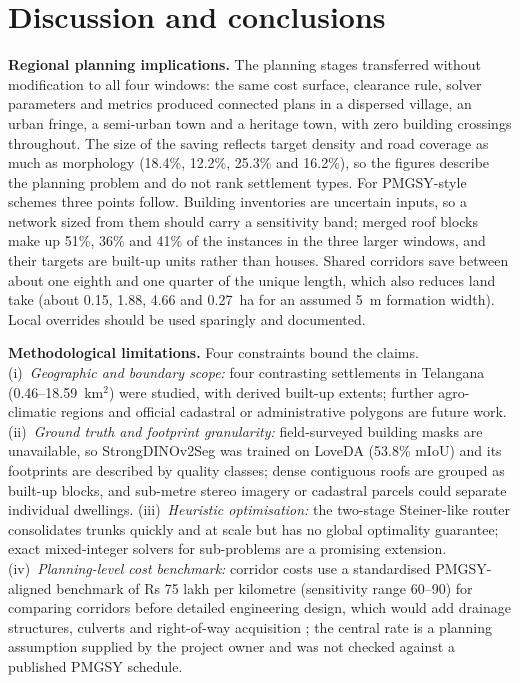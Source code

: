 \documentclass[10pt,a4paper,twocolumn]{article}
\newcommand{\dinoseg}{StrongDINOv2Seg}
\begin{document}
\section{Discussion and conclusions}\label{sec:disc}
\textbf{Regional planning implications.} The planning stages transferred without modification to all four windows: the same cost surface, clearance rule, solver parameters and metrics produced connected plans in a dispersed village, an urban fringe, a semi-urban town and a heritage town, with zero building crossings throughout. The size of the saving reflects target density and road coverage as much as morphology (18.4\%, 12.2\%, 25.3\% and 16.2\%), so the figures describe the planning problem and do not rank settlement types. For PMGSY-style schemes \cite{pmgsy,irc2002sp20} three points follow. Building inventories are uncertain inputs, so a network sized from them should carry a sensitivity band; merged roof blocks make up 51\%, 36\% and 41\% of the instances in the three larger windows, and their targets are built-up units rather than houses. Shared corridors save between about one eighth and one quarter of the unique length, which also reduces land take (about 0.15, 1.88, 4.66 and 0.27~ha for an assumed 5~m formation width). Local overrides should be used sparingly and documented.

\textbf{Methodological limitations.} Four constraints bound the claims. (i)~\emph{Geographic and boundary scope:} four contrasting settlements in Telangana (0.46--18.59~km$^2$) were studied, with derived built-up extents; further agro-climatic regions and official cadastral or administrative polygons are future work. (ii)~\emph{Ground truth and footprint granularity:} field-surveyed building masks are unavailable, so \dinoseg{} was trained on LoveDA (53.8\% mIoU) and its footprints are described by quality classes; dense contiguous roofs are grouped as built-up blocks, and sub-metre stereo imagery or cadastral parcels could separate individual dwellings. (iii)~\emph{Heuristic optimisation:} the two-stage Steiner-like router consolidates trunks quickly and at scale but has no global optimality guarantee; exact mixed-integer solvers for sub-problems are a promising extension. (iv)~\emph{Planning-level cost benchmark:} corridor costs use a standardised PMGSY-aligned benchmark of Rs 75 lakh per kilometre (sensitivity range 60--90) for comparing corridors before detailed engineering design, which would add drainage structures, culverts and right-of-way acquisition \cite{irc2002sp20}; the central rate is a planning assumption supplied by the project owner and was not checked against a published PMGSY schedule.
\end{document}
